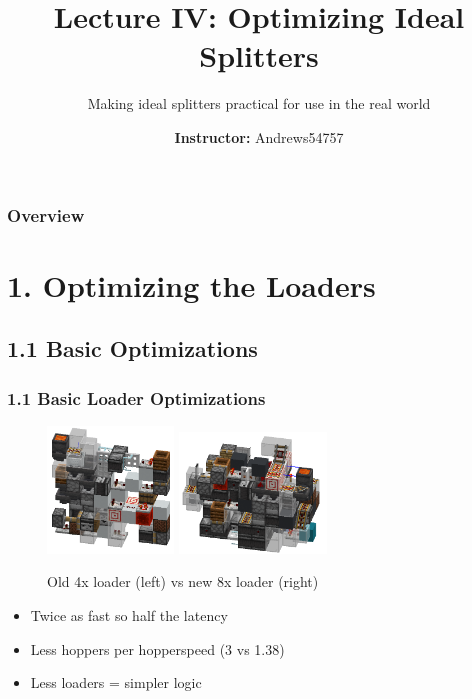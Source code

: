 \documentclass[aspectratio=169]{beamer}
\title[Ideal Splitter Optimization]{Lecture IV: Optimizing Ideal Splitters}
\subtitle{Making ideal splitters practical for use in the real world}
\date{}
\author{\textbf{Instructor:} Andrews54757}
\institute{
    CSE269: Introduction to Encoded Storage\\
    S$\infty$ntech Annals
}
\begin{document}
\maketitle

\begin{frame}
\frametitle{Overview}
\tableofcontents
\end{frame}

\section{1. Optimizing the Loaders}

\subsection{1.1 Basic Optimizations}

\begin{frame}
	\frametitle{1.1 Basic Loader Optimizations}
    

	\begin{figure}
        \includegraphics[width=0.3\textwidth]{oldloader.png}
		\includegraphics[width=0.35\textwidth]{newloader.png}
		\caption{Old 4x loader (left) vs new 8x loader (right)}
	\end{figure}


    \begin{itemize}
		\item Twice as fast so half the latency
		\item Less hoppers per hopperspeed (3 vs 1.38)
		\item Less loaders = simpler logic
	\end{itemize}
	
\end{frame}
\end{document}

